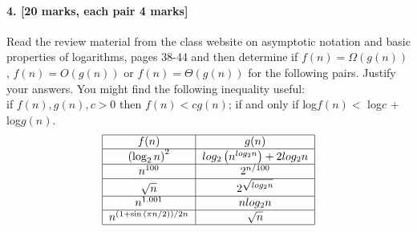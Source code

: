 \documentclass[a4paper]{scrartcl}
\begin{document}
\paragraph{4. [20 marks, each pair 4 marks]}
\label{sec:Question 4}
Read the review material from the class website on asymptotic notation and basic properties of logarithms, pages 38-44 and then determine if $f(n) = \Omega(g(n))$, $f(n) = O(g(n))$ or $f (n) = \Theta(g(n))$ for the following pairs. Justify your answers. You might find the following inequality useful: \\
if $f (n), g(n), c > 0$ then $f (n) < c g(n)$; if and only if log$f(n) <$ log$c$ + log$g(n)$.
\begin{align*}
\begin{tabular}{|c | c |}
  \hline
  $f(n)$ & $g(n)$ \\
  \hline
  $\left(\log_2n\right)^2$ & $log_2\left(n^{log_2{n}}\right) + 2 log_2n$ \\
  \hline
  $n^{100}$ & $2^{n/100}$ \\
  \hline
  $\sqrt{n}$ & $2^{\sqrt{log_2 n}}$\\
    \hline
  $n^{1.001}$ & $n log_2 n$\\
  \hline
  $n^{(1+\sin{(\pi n/2))}/2n}$ &  $\sqrt{n}$\\
  \hline
\end{tabular}
\end{align*}
\end{document}
